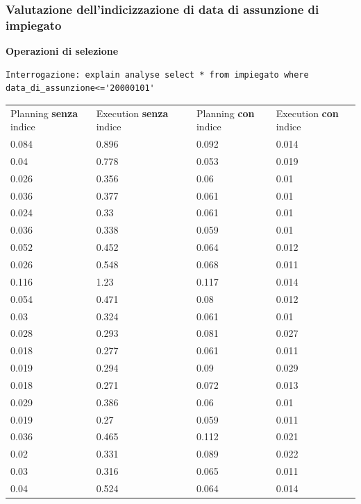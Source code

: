 \documentclass{article}
\begin{document}
\subsubsection{Valutazione dell'indicizzazione di data di assunzione di impiegato}
\textbf{Operazioni di selezione}
\begin{verbatim}
Interrogazione: explain analyse select * from impiegato where data_di_assunzione<='20000101'
\end{verbatim}
\begin{table}[H]
\renewcommand{\arraystretch}{1.1}
\centering
\begin{tabular}{|p{4cm}|p{4cm}|p{0cm}|p{4cm}|p{4cm}|}
\cline{1-5}
Planning \textbf{senza} indice & Execution \textbf{senza} indice & & Planning \textbf{con} indice & Execution \textbf{con} indice \\ \cline{1-5}
0.084 & 0.896 & & 0.092 & 0.014 \\ \cline{1-5}
0.04 & 0.778 & & 0.053 & 0.019 \\ \cline{1-5}
0.026 & 0.356 & & 0.06 & 0.01 \\ \cline{1-5}
0.036 & 0.377 & & 0.061 & 0.01 \\ \cline{1-5}
0.024 & 0.33 & & 0.061 & 0.01 \\ \cline{1-5}
0.036 & 0.338 & & 0.059 & 0.01 \\ \cline{1-5}
0.052 & 0.452 & & 0.064 & 0.012 \\ \cline{1-5}
0.026 & 0.548 & & 0.068 & 0.011 \\ \cline{1-5}
0.116 & 1.23 & & 0.117 & 0.014 \\ \cline{1-5}
0.054 & 0.471 & & 0.08 & 0.012 \\ \cline{1-5}
0.03 & 0.324 & & 0.061 & 0.01 \\ \cline{1-5}
0.028 & 0.293 & & 0.081 & 0.027 \\ \cline{1-5}
0.018 & 0.277 & & 0.061 & 0.011 \\ \cline{1-5}
0.019 & 0.294 & & 0.09 & 0.029 \\ \cline{1-5}
0.018 & 0.271 & & 0.072 & 0.013 \\ \cline{1-5}
0.029 & 0.386 & & 0.06 & 0.01 \\ \cline{1-5}
0.019 & 0.27 & & 0.059 & 0.011 \\ \cline{1-5}
0.036 & 0.465 & & 0.112 & 0.021 \\ \cline{1-5}
0.02 & 0.331 & & 0.089 & 0.022 \\ \cline{1-5}
0.03 & 0.316 & & 0.065 & 0.011 \\ \cline{1-5}
0.04 & 0.524 & & 0.064 & 0.014 \\ \cline{1-5}

\end{tabular}
\end{table}
\end{document}
